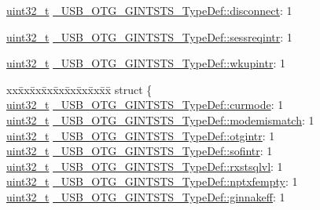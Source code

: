 \begin{DoxyCompactItemize}
\item 
\hyperlink{stdint_8h_a435d1572bf3f880d55459d9805097f62}{uint32\-\_\-t} \hyperlink{group___u_s_b___o_t_g___d_r_i_v_e_r_gaa4d5b02c9b36bed21a2fecaa2de3f680}{\-\_\-\-U\-S\-B\-\_\-\-O\-T\-G\-\_\-\-G\-I\-N\-T\-S\-T\-S\-\_\-\-Type\-Def\-::disconnect}\-: 1
\item 
\hyperlink{stdint_8h_a435d1572bf3f880d55459d9805097f62}{uint32\-\_\-t} \hyperlink{group___u_s_b___o_t_g___d_r_i_v_e_r_ga181308d74f67372ff71df2d874939732}{\-\_\-\-U\-S\-B\-\_\-\-O\-T\-G\-\_\-\-G\-I\-N\-T\-S\-T\-S\-\_\-\-Type\-Def\-::sessreqintr}\-: 1
\item 
\hyperlink{stdint_8h_a435d1572bf3f880d55459d9805097f62}{uint32\-\_\-t} \hyperlink{group___u_s_b___o_t_g___d_r_i_v_e_r_gab4bdf68468fff59d9d9e808148a9638d}{\-\_\-\-U\-S\-B\-\_\-\-O\-T\-G\-\_\-\-G\-I\-N\-T\-S\-T\-S\-\_\-\-Type\-Def\-::wkupintr}\-: 1
\item 
\begin{tabbing}
xx\=xx\=xx\=xx\=xx\=xx\=xx\=xx\=xx\=\kill
struct \{\\
\>\hyperlink{stdint_8h_a435d1572bf3f880d55459d9805097f62}{uint32\_t} \hyperlink{group___u_s_b___o_t_g___d_r_i_v_e_r_ga752eb7894d8acb9f1a4394967bfdd9ff}{\_USB\_OTG\_GINTSTS\_TypeDef::curmode}: 1\\
\>\hyperlink{stdint_8h_a435d1572bf3f880d55459d9805097f62}{uint32\_t} \hyperlink{group___u_s_b___o_t_g___d_r_i_v_e_r_gab4fbf47de9e36e092edfc6ee201616d2}{\_USB\_OTG\_GINTSTS\_TypeDef::modemismatch}: 1\\
\>\hyperlink{stdint_8h_a435d1572bf3f880d55459d9805097f62}{uint32\_t} \hyperlink{group___u_s_b___o_t_g___d_r_i_v_e_r_ga8c6022a9b96f1a881f956e7bafe64497}{\_USB\_OTG\_GINTSTS\_TypeDef::otgintr}: 1\\
\>\hyperlink{stdint_8h_a435d1572bf3f880d55459d9805097f62}{uint32\_t} \hyperlink{group___u_s_b___o_t_g___d_r_i_v_e_r_ga90db453bd6bcb2c78bab6c0688727181}{\_USB\_OTG\_GINTSTS\_TypeDef::sofintr}: 1\\
\>\hyperlink{stdint_8h_a435d1572bf3f880d55459d9805097f62}{uint32\_t} \hyperlink{group___u_s_b___o_t_g___d_r_i_v_e_r_ga5804e5c8afb57b10e1fd90dd4ad3286f}{\_USB\_OTG\_GINTSTS\_TypeDef::rxstsqlvl}: 1\\
\>\hyperlink{stdint_8h_a435d1572bf3f880d55459d9805097f62}{uint32\_t} \hyperlink{group___u_s_b___o_t_g___d_r_i_v_e_r_ga7f95aea2bd53e9566d83818c6062f1ca}{\_USB\_OTG\_GINTSTS\_TypeDef::nptxfempty}: 1\\
\>\hyperlink{stdint_8h_a435d1572bf3f880d55459d9805097f62}{uint32\_t} \hyperlink{group___u_s_b___o_t_g___d_r_i_v_e_r_gaa5f3025af7ef429aaf5284bc974f47bb}{\_USB\_OTG\_GINTSTS\_TypeDef::ginnakeff}: 1\\

\end{tabbing}
\end{DoxyCompactItemize}
